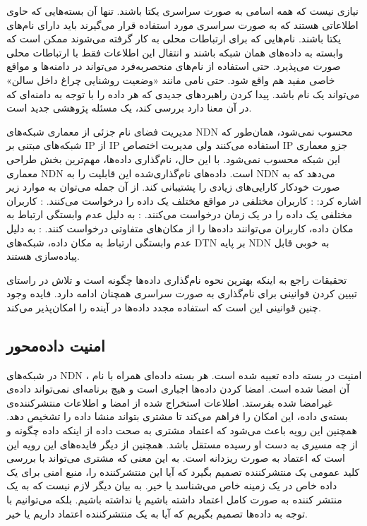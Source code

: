 نیازی نیست که همه اسامی به صورت سراسری یکتا باشند. تنها آن بسته‌هایی که حاوی اطلاعاتی هستند که به صورت سراسری مورد استفاده قرار می‌گیرند باید دارای نام‌های یکتا باشند. نام‌‌هایی که برای ارتباطات محلی به کار گرفته می‌شوند ممکن است که وابسته به داده‌های همان شبکه باشند و انتقال این اطلاعات فقط با ارتباطات محلی صورت می‌پذیرد. حتی استفاده از نام‌های منحصربه‌فرد می‌تواند در دامنه‌ها و مواقع خاصی مفید هم واقع شود. حتی نامی مانند «وضعیت روشنایی چراغ داخل سالن» می‌تواند یک نام باشد. پیدا کردن راهبردهای جدیدی که هر داده را با توجه به دامنه‌ای که در ‌آن معنا دارد بررسی کند، یک مسئله پژوهشی جدید است. 

مدیریت فضای نام جزئی از معماری شبکه‌های NDN  محسوب نمی‌شود، همان‌طور که شبکه‌های مبتنی بر IP از IP استفاده می‌کنند ولی مدیریت اختصاص IP جزو معماری این شبکه محسوب نمی‌شود. با این حال، نام‌گذاری داده‌‌ها، مهم‌ترین بخش طراحی معماری NDN است. داده‌های نام‌گذاری‌شده این قابلیت را به NDN می‌دهد که به صورت خودکار کارایی‌های زیادی را پشتیبانی کند. از آن جمله می‌توان به موارد زیر اشاره کرد:
 : کاربران مختلفی در مواقع مختلف یک داده را درخواست می‌کنند. 
 : کاربران مختلفی یک داده را در یک زمان درخواست می‌کنند.
 :‌  به دلیل عدم وابستگی ارتباط به مکان داده، کاربران می‌توانند داده‌ها را از مکان‌های متفاوتی درخواست کنند. 
 : به دلیل عدم وابستگی ارتباط به مکان داده، شبکه‌های DTN بر پایه NDN به خوبی قابل پیاده‌سازی هستند. 

تحقیقات راجع به اینکه بهترین نحوه نام‌گذاری داده‌ها چگونه است و تلاش در راستای تبیین کردن قوانینی برای نام‌گذاری به صورت سراسری همچنان ادامه دارد. فایده وجود چنین قوانینی این است که استفاده مجدد داده‌ها در آینده را امکان‌پذیر می‌کند.  
\subsection{امنیت داده‌محور}
در شبکه‌های ‌NDN ، امنیت در بسته داده تعبیه شده است.
\cite{nnt}
هر بسته داده‌ای همراه با نام آن امضا شده است. امضا کردن داده‌‌ها اجباری است و هیچ برنامه‌ای نمی‌تواند داده‌ی غیرامضا شده بفرستد. اطلاعات استخراج شده از  امضا و اطلاعات منتشرکننده‌ی بسته‌ی داده، این امکان را فراهم می‌کند تا مشتری بتواند منشا داده را تشخیص دهد. همچنین این رویه باعث می‌شود که  اعتماد مشتری به صحت داده از اینکه داده چگونه و از چه مسیری به دست او رسیده مستقل باشد. همچنین از دیگر فایده‌های این رویه این است که اعتماد به صورت ریزدانه است. به این معنی که مشتری می‌تواند با بررسی کلید عمومی یک منتشرکننده تصمیم بگیرد که آیا این منتشرکننده را، منبع امنی برای یک داده خاص در یک زمینه خاص می‌شناسد یا خیر. به بیان دیگر لازم نیست که به یک منتشر کننده به صورت کامل اعتماد داشته باشیم یا نداشته باشیم. بلکه می‌توانیم با توجه به داده‌ها تصمیم بگیریم که آیا به یک منتشرکننده اعتماد داریم یا خیر. 
 
